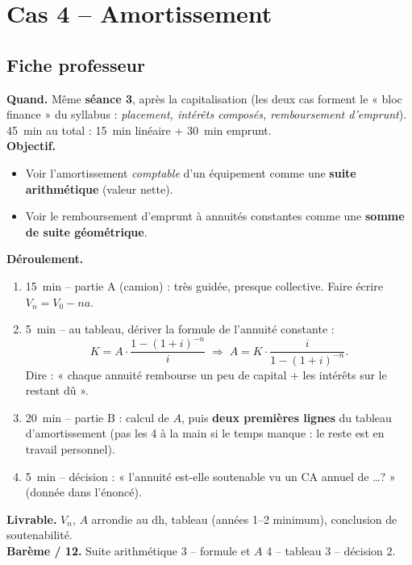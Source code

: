 \documentclass[12pt,a4paper]{article}
\begin{document}
\section{Cas 4 -- Amortissement}

\subsection{Fiche professeur}

\begin{profbox}
\textbf{Quand.} Même \textbf{séance 3}, après la capitalisation (les deux cas forment le « bloc finance » du syllabus : \emph{placement, intérêts composés, remboursement d'emprunt}). 45~min au total : 15~min linéaire + 30~min emprunt.\\
\textbf{Objectif.}
\begin{itemize}[leftmargin=1.2cm]
  \item Voir l'amortissement \emph{comptable} d'un équipement comme une \textbf{suite arithmétique} (valeur nette).
  \item Voir le remboursement d'emprunt à annuités constantes comme une \textbf{somme de suite géométrique}.
\end{itemize}
\textbf{Déroulement.}
\begin{enumerate}[leftmargin=1.3cm]
  \item 15~min -- partie A (camion) : très guidée, presque collective. Faire écrire $V_n=V_0-na$.
  \item 5~min -- au tableau, dériver la formule de l'annuité constante :
  $$K=A\cdot\frac{1-(1+i)^{-n}}{i} \;\Longrightarrow\; A=K\cdot\frac{i}{1-(1+i)^{-n}}.$$
  Dire : « chaque annuité rembourse un peu de capital + les intérêts sur le restant dû ».
  \item 20~min -- partie B : calcul de $A$, puis \textbf{deux premières lignes} du tableau d'amortissement (pas les 4 à la main si le temps manque : le reste est en travail personnel).
  \item 5~min -- décision : « l'annuité est-elle soutenable vu un CA annuel de \ldots ? » (donnée dans l'énoncé).
\end{enumerate}
\textbf{Livrable.} $V_n$, $A$ arrondie au dh, tableau (années 1--2 minimum), conclusion de soutenabilité.\\
\textbf{Barème / 12.} Suite arithmétique 3 -- formule et $A$ 4 -- tableau 3 -- décision 2.
\end{profbox}
\end{document}
